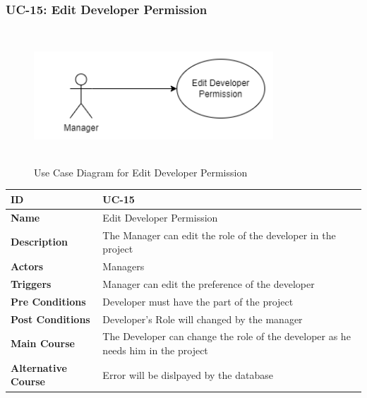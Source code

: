 \subsubsection{UC-15: Edit Developer Permission}
\begin{figure}[H]
    \includegraphics[height=5cm, width=0.8\textwidth]{./diagrams/Use Case/u15.png}
    \centering
    \caption{Use Case Diagram for Edit Developer Permission}
    \label{fig:Usecase1}
\end{figure}

\begin{center}
    \begin{tabularx}{\textwidth}{|l|X|}
        \hline
        \textbf{ID}                 & UC-15                                                                             \\
        \hline
        \textbf{Name}               & Edit Developer Permission                                                         \\
        \hline
        \textbf{Description}        & The Manager can edit the role of the developer in the project                     \\
        \hline
        \textbf{Actors}             & Managers                                                                          \\
        \hline
        \textbf{Triggers}           & Manager can edit the preference of the developer                                  \\
        \hline
        \textbf{Pre Conditions}     & Developer must have the part of the project                                       \\
        \hline
        \textbf{Post Conditions}    & Developer's Role will changed by the manager                                      \\
        \hline
        \textbf{Main Course}        & The Developer can change the role of the developer as he needs him in the project \\
        \hline
        \textbf{Alternative Course} & Error will be dislpayed by the database                                           \\
        \hline
    \end{tabularx}
\end{center}
\newpage


